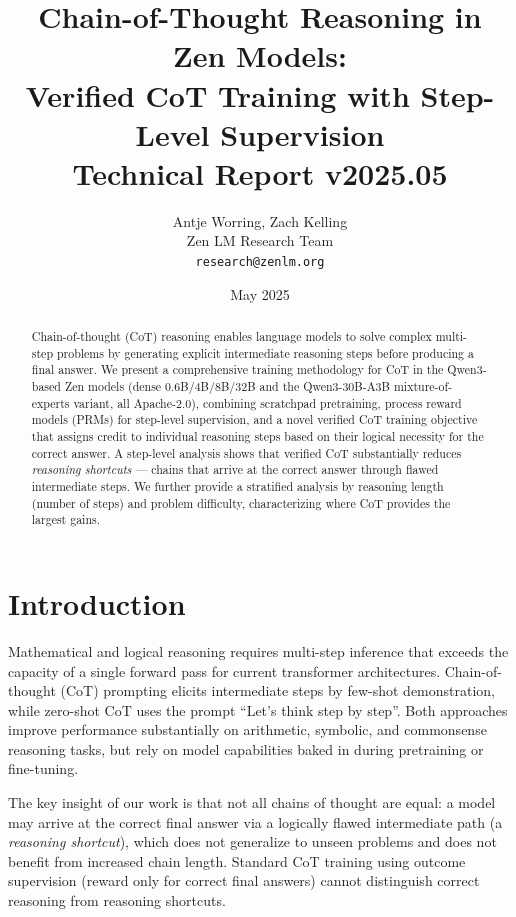 \documentclass[11pt,a4paper]{article}
\title{\textbf{Chain-of-Thought Reasoning in Zen Models:\\
Verified CoT Training with Step-Level Supervision}\\
\large Technical Report v2025.05}
\author{Antje Worring, Zach Kelling \\ Zen LM Research Team\\
\texttt{research@zenlm.org}}
\date{May 2025}
\begin{document}
\maketitle

\begin{abstract}
Chain-of-thought (CoT) reasoning enables language models to solve complex multi-step
problems by generating explicit intermediate reasoning steps before producing a final
answer. We present a comprehensive training methodology for CoT in the Qwen3-based Zen
models (dense 0.6B/4B/8B/32B and the Qwen3-30B-A3B mixture-of-experts variant, all
Apache-2.0), combining scratchpad pretraining, process reward models (PRMs) for step-level
supervision, and a novel verified CoT training objective that assigns credit to
individual reasoning steps based on their logical necessity for the correct answer.
A step-level analysis shows that verified CoT substantially reduces \emph{reasoning
shortcuts} — chains that arrive at the correct answer through flawed intermediate steps.
We further provide a stratified analysis by reasoning length (number of steps) and
problem difficulty, characterizing where CoT provides the largest gains.
\end{abstract}

\tableofcontents
\newpage

\section{Introduction}
\label{sec:intro}

Mathematical and logical reasoning requires multi-step inference that exceeds the
capacity of a single forward pass for current transformer architectures. Chain-of-thought
(CoT) prompting \cite{wei2022cot} elicits intermediate steps by few-shot demonstration,
while zero-shot CoT \cite{kojima2022zeroshot} uses the prompt ``Let's think step by step''.
Both approaches improve performance substantially on arithmetic, symbolic, and commonsense
reasoning tasks, but rely on model capabilities baked in during pretraining or fine-tuning.

The key insight of our work is that not all chains of thought are equal: a model may
arrive at the correct final answer via a logically flawed intermediate path (a
\emph{reasoning shortcut}), which does not generalize to unseen problems and does not
benefit from increased chain length. Standard CoT training using outcome supervision
(reward only for correct final answers) cannot distinguish correct reasoning from
reasoning shortcuts.
\end{document}
